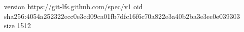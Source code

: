 version https://git-lfs.github.com/spec/v1
oid sha256:4054a252322ecc0e3cd09ca01fb7dfc16f6c70a822e3a40b2ba3e3ee0e039303
size 1512
